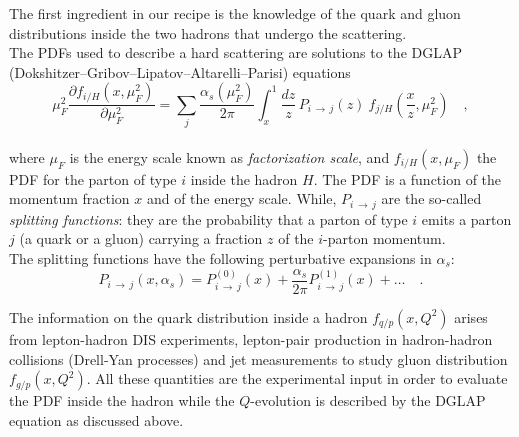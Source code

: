 The first ingredient in our recipe is the knowledge of the quark and gluon distributions inside the two hadrons that undergo the scattering. 
\\
The PDFs used to describe a hard scattering are solutions to the DGLAP (Dokshitzer–Gribov–Lipatov–Altarelli–Parisi) equations \cite{Lipatov:400357, Gribov:427157, ALTARELLI1977298, Dokshitzer:1977sg}
\\
\begin{equation}
	\mu_F^2\frac{\partial f_{i/H}(x,\mu_F^2)}{\partial\mu_F^2}=\displaystyle\sum_j\frac{\alpha_s(\mu_F^2)}{2\pi}\displaystyle\int_x^1 \frac{dz}{z}\, P_{i\,\rightarrow\,j}(z)\ f_{j/H}\left(\frac{x}{z},\mu_F^2\right)\quad ,
\end{equation}
\\
where $\mu_F$ is the energy scale known as  \textit{factorization scale}, and $f_{i/H}(x,\mu_F)$ the PDF for the parton of type $i$ inside the hadron $H$. The PDF is a function of the momentum fraction $x$ and of the energy scale.
While, $P_{i\,\rightarrow\,j}$ are the so-called \textit{splitting functions}: they are the probability that a parton of type $i$ emits a parton $j$ (a quark or a gluon) carrying a fraction $z$ of the $i$-parton momentum.
\\
The splitting functions have the following perturbative expansions in $\alpha_s$: 
\begin{equation}
	P_{i\,\rightarrow\,j}(x,\alpha_s)=P_{i\,\rightarrow\,j}^{(0)}(x)+\frac{\alpha_s}{2\pi}P_{i\,\rightarrow\,j}^{(1)}(x)+\dots\quad .
\end{equation}


The information on the quark distribution inside a hadron $f_{q/p}(x,Q^2)$ arises from lepton-hadron DIS experiments, lepton-pair production in hadron-hadron collisions (Drell-Yan processes) and jet measurements to study gluon distribution $f_{g/p}(x,Q^2)$. All these quantities are the experimental input in order to evaluate the PDF inside the hadron while the $Q$-evolution is described by the DGLAP equation as discussed above.



